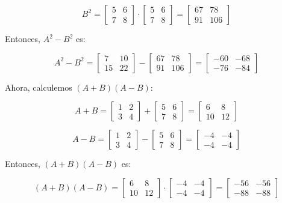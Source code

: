 \documentclass[a4paper,12pt]{article}
\begin{document}
\[ B^2 = \begin{bmatrix} 5 & 6 \\ 7 & 8 \end{bmatrix} \cdot \begin{bmatrix} 5 & 6 \\ 7 & 8 \end{bmatrix} = \begin{bmatrix} 67 & 78 \\ 91 & 106 \end{bmatrix} \]

Entonces, \(A^2 - B^2\) es:

\[ A^2 - B^2 = \begin{bmatrix} 7 & 10 \\ 15 & 22 \end{bmatrix} - \begin{bmatrix} 67 & 78 \\ 91 & 106 \end{bmatrix} = \begin{bmatrix} -60 & -68 \\ -76 & -84 \end{bmatrix} \]

Ahora, calculemos \((A+B)(A-B)\):

\[ A+B = \begin{bmatrix} 1 & 2 \\ 3 & 4 \end{bmatrix} + \begin{bmatrix} 5 & 6 \\ 7 & 8 \end{bmatrix} = \begin{bmatrix} 6 & 8 \\ 10 & 12 \end{bmatrix} \]

\[ A-B = \begin{bmatrix} 1 & 2 \\ 3 & 4 \end{bmatrix} - \begin{bmatrix} 5 & 6 \\ 7 & 8 \end{bmatrix} = \begin{bmatrix} -4 & -4 \\ -4 & -4 \end{bmatrix} \]

Entonces, \((A+B)(A-B)\) es:

\[ (A+B)(A-B) = \begin{bmatrix} 6 & 8 \\ 10 & 12 \end{bmatrix} \cdot \begin{bmatrix} -4 & -4 \\ -4 & -4 \end{bmatrix} = \begin{bmatrix} -56 & -56 \\ -88 & -88 \end{bmatrix} \]
\end{document}
